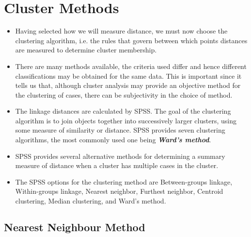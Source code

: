 \documentclass[a4paper,12pt]{article}
\begin{document}


\section{Cluster Methods}
\begin{itemize}
\item Having selected how we will measure distance, we must now choose the clustering algorithm, i.e. the rules that govern between which points distances are measured to determine cluster membership. 
\item There are many methods available, the criteria used differ and hence
different classifications may be obtained for the same data. This is important since it tells us that, although cluster analysis may provide an objective method for the clustering of cases, there can be subjectivity in the choice of method. 

\item The linkage distances are calculated by SPSS. The goal of the clustering algorithm is to join objects together into successively larger clusters, using some measure of similarity or distance. SPSS provides seven clustering algorithms, the most commonly used one being  \textbf{\textit{Ward's method}}.

\item SPSS provides several alternative methods for determining a summary measure of distance when a cluster has multiple cases in the cluster.
\item   The SPSS options for the clustering method are Between-groups linkage, Within-groups linkage, Nearest neighbor, Furthest neighbor, Centroid clustering, Median clustering, and Ward's method.

\end{itemize}



\subsection{Nearest Neighbour Method} 
\end{document}
